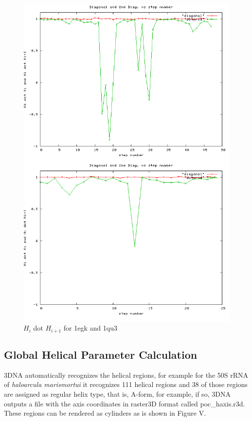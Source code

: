 \begin{figure}[htbp]
\centering
\includegraphics[scale=0.4]{normalized.png}
\caption{$H_i$ dot $H_{i+1}$ for 1egk and 1qu3} 
\end{figure}

\subsection{Global Helical Parameter Calculation}

3DNA automatically recognizes the helical regions, for example for the
50S  rRNA of \textit{haloarcula marismortui}   it recognizes  111 helical
regions and 38 of those regions are assigned as  regular helix type, that
is,  A-form, for  example, if  so, 3DNA  outputs a  file with  the axis
coordinates in raster3D format called poc\_haxis.r3d.
These regions can be rendered as cylinders as is shown in Figure V.

